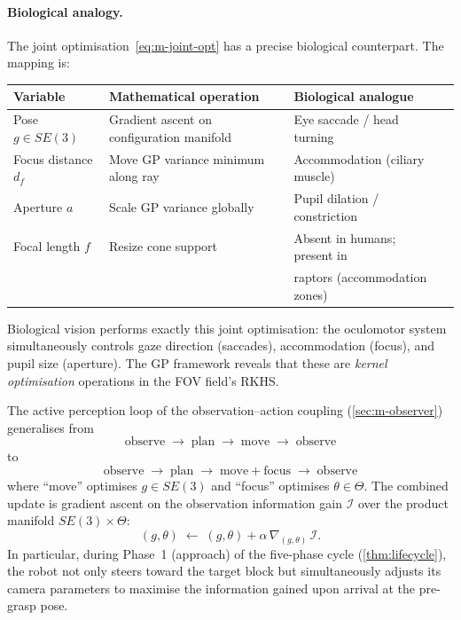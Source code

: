 \paragraph{Biological analogy.}
The joint optimisation~\eqref{eq:m-joint-opt} has a precise biological
counterpart.  The mapping is:
\begin{center}
\begin{tabular}{@{}llll@{}}
\toprule
Variable & Mathematical operation & Biological analogue \\
\midrule
Pose $g \in SE(3)$
  & Gradient ascent on configuration manifold
  & Eye saccade / head turning \\
Focus distance $d_f$
  & Move GP variance minimum along ray
  & Accommodation (ciliary muscle) \\
Aperture $a$
  & Scale GP variance globally
  & Pupil dilation / constriction \\
Focal length $f$
  & Resize cone support
  & Absent in humans; present in \\
  & & raptors (accommodation zones) \\
\bottomrule
\end{tabular}
\end{center}
Biological vision performs exactly this joint optimisation: the
oculomotor system simultaneously controls gaze direction (saccades),
accommodation (focus), and pupil size (aperture).  The GP framework
reveals that these are \emph{kernel optimisation} operations in the
FOV field's RKHS.

\begin{remark}
\label{rem:m-active-optics}
The active perception loop of the observation--action coupling
(\cref{sec:m-observer}) generalises from
\[
  \text{observe} \;\to\; \text{plan} \;\to\; \text{move}
  \;\to\; \text{observe}
\]
to
\[
  \text{observe} \;\to\; \text{plan} \;\to\;
  \text{move} + \text{focus} \;\to\; \text{observe}
\]
where ``move'' optimises $g \in SE(3)$ and ``focus'' optimises
$\theta \in \Theta$.  The combined update is gradient ascent on the
observation information gain $\mathcal{I}$ over the product manifold
$SE(3) \times \Theta$:
\begin{equation}\label{eq:m-active-optics-update}
  (g, \theta)
  \;\leftarrow\;
  (g, \theta) + \alpha\,\nabla_{(g,\theta)}\,\mathcal{I}.
\end{equation}
In particular, during Phase~1 (approach) of the five-phase cycle
(\cref{thm:lifecycle}), the robot not only steers toward the target
block but simultaneously adjusts its camera parameters to maximise the
information gained upon arrival at the pre-grasp pose.
\end{remark}

